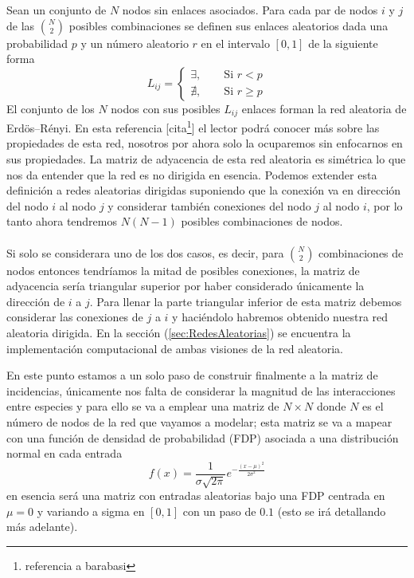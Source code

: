 \begin{definición}\label{def:redAleatoria}
	Sean un conjunto de $N$ nodos sin enlaces asociados. Para cada par de nodos $i$ y $j$ de las $\binom{N}{2}$ posibles combinaciones se definen sus enlaces aleatorios dada una probabilidad $p$ y un número aleatorio $r$ en el intervalo $[0,1]$ de la siguiente forma
	$$
	L_{ij}=\begin{cases}
		\exists,\qquad\text{Si }r<p\\
		\nexists,\qquad\text{Si }r\geq p
	\end{cases}
	$$
	El conjunto de los $N$ nodos con sus posibles $L_{ij}$ enlaces forman la red aleatoria de Erdös–Rényi. En esta referencia [cita\footnote{referencia a barabasi}] el lector podrá conocer más sobre las propiedades de esta red, nosotros por ahora solo la ocuparemos sin enfocarnos en sus propiedades. La matriz de adyacencia de esta red aleatoria es simétrica lo que nos da entender que la red es no dirigida en esencia. Podemos extender esta definición a redes aleatorias dirigidas suponiendo que la conexión va en dirección del nodo $i$ al nodo $j$ y considerar también conexiones del nodo $j$ al nodo $i$, por lo tanto ahora tendremos $N(N-1)$ posibles combinaciones de nodos. \\
	\\
	Si solo se considerara uno de los dos casos, es decir, para $\binom{N}{2}$ combinaciones de nodos entonces tendríamos la mitad de posibles conexiones, la matriz de adyacencia sería triangular superior por haber considerado únicamente la dirección de $i$ a $j$. Para llenar la parte triangular inferior de esta matriz debemos considerar las conexiones de $j$ a $i$ y haciéndolo habremos obtenido nuestra red aleatoria dirigida. En la sección (\ref{sec:RedesAleatorias}) se encuentra la implementación computacional de ambas visiones de la red aleatoria.
\end{definición}
\newpage
\setlength{\parindent}{0cm}En este punto estamos a un solo paso de construir finalmente a la matriz de incidencias, únicamente nos falta de considerar la magnitud de las interacciones entre especies y para ello se va a emplear una matriz de $N\times N$ donde $N$ es el número de nodos de la red que vayamos a modelar; esta matriz se va a mapear con una función de densidad de probabilidad (FDP) asociada a una distribución normal en cada entrada
$$f(x)=\frac{1}{\sigma\sqrt{2\pi}}e^{-\frac{(x-\mu)^2}{2\sigma^2}}$$
en esencia será una matriz con entradas aleatorias bajo una FDP centrada en $\mu = 0$ y variando a sigma en $[0,1]$ con un paso de $0.1$ (esto se irá detallando más adelante). 

